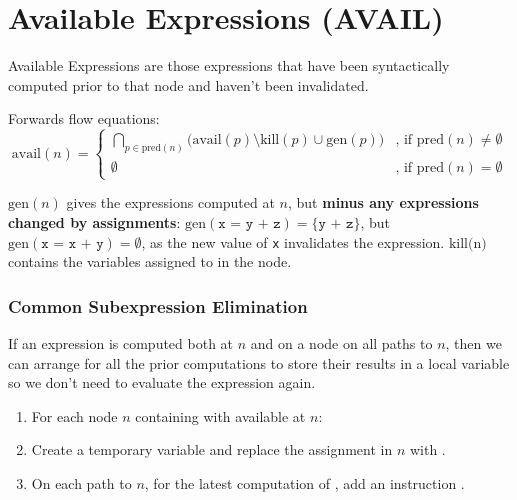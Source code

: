 \documentclass[a4paper, 11pt]{article}
\begin{document}
\section*{Available Expressions (AVAIL)}
{
    Available Expressions are those expressions that have been syntactically computed prior to that node and haven't been invalidated.

    Forwards flow equations:
    \begin{equation*}
    \text{avail}(n) =
    \begin{cases}
    \bigcap_{p \in \text{pred}(n)}{\big(\text{avail}(p) \setminus \text{kill}(p) \cup \text{gen}(p)\big)} &\text{, if pred}(n) \neq \emptyset \\
    \emptyset &\text{, if pred}(n) = \emptyset
    \end{cases}
    \end{equation*}

    \(\text{gen}(n)\) gives the expressions computed at \(n\), but \textbf{minus any expressions changed by assignments}: \(\text{gen}(\texttt{x = y + z}) = \{\texttt{y + z}\}\), but \(\text{gen}(\texttt{x = x + y}) = \emptyset\), as the new value of \texttt{x} invalidates the expression. \(\text{kill(n)}\) contains the variables assigned to in the node.

    \subsubsection*{Common Subexpression Elimination}
    {
        If an expression is computed both at \(n\) and on a node on all paths to \(n\), then we can arrange for all the prior computations to store their results in a local variable so we don't need to evaluate the expression again.

        \begin{enumerate}
        \item For each node \(n\) containing  with  available at \(n\):
        \item Create a temporary variable  and replace the assignment in \(n\) with .
        \item On each path to \(n\), for the latest computation of , add an instruction .
        \end{enumerate}
    }
}
\end{document}
